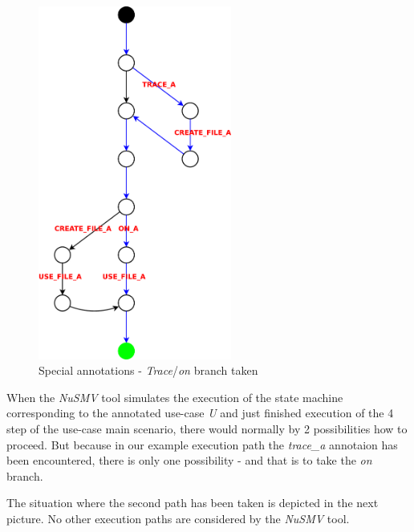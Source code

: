 \begin{figure}[ht]
  \centering
  \includegraphics[width=180pt]{images/traceTest_path_taken}
  \caption{Special annotations - \emph{Trace}/\emph{on} branch taken}
  \label{fig:traceTestTaken}
\end{figure}
When the \emph{NuSMV} tool simulates the execution of the state machine corresponding to the annotated use-case \emph{U} and just finished
execution of the 4 step of the use-case main scenario, there would normally by 2 possibilities how to proceed. But because in our
example execution path the \emph{trace\_a} annotaion has been encountered, there is only one possibility - and that is to take the
\emph{on} branch.

The situation where the second path has been taken is depicted in the next picture. No other execution paths are considered by the
\emph{NuSMV} tool.

\newpage

